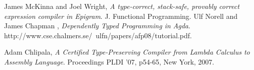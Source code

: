 \documentclass[paper=a4, fontsize=11pt]{scrartcl} %
\numberwithin{equation}{section} %
\numberwithin{figure}{section} %
\numberwithin{table}{section} %
\begin{document}
\begin{thebibliography}{9}
  James McKinna and Joel Wright,
    \emph{A type-correct, stack-safe, provably correct expression compiler in Epigram}.
    J. Functional Programming.
  Ulf Norell and James Chapman ,
    \emph{Dependently Typed Programming in Agda}.
    http://www.cse.chalmers.se/~ulfn/papers/afp08/tutorial.pdf.

	Adam Chlipala,
  	\emph{A Certified Type-Preserving Compiler from Lambda Calculus to
Assembly Language}.
  	Proceedings PLDI '07, p54-65, New York, 2007.
	
\end{thebibliography}
\end{document}
